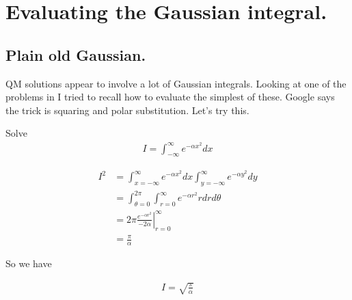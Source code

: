 
%
%



\chapter{Evaluating the Gaussian integral. }
\label{chap:gaussian}
\date{ Jan 05, 2009.  $RCSfile: gaussian.tex,v $ Last $Revision: 1.13 $ $Date: 2009/06/14 23:51:45 $ }

%

\section{Plain old Gaussian. }

QM solutions appear to involve a lot of Gaussian integrals.  Looking at one
of the problems in \cite{mcmahon2005qmd} I tried to recall how to evaluate
the simplest of these.  Google says the trick is squaring and polar 
substitution.  Let's try this.

Solve
\begin{align*}
I = \int_{-\infty}^\infty e^{-\alpha x^2} dx
\end{align*}

\begin{align*}
I^2 
&= \int_{x= -\infty}^\infty e^{-\alpha x^2} dx \int_{y = -\infty}^\infty e^{-\alpha y^2} dy \\
&= \int_{\theta=0}^{2\pi}\int_{r= 0}^\infty e^{-\alpha r^2} r dr d\theta \\
&= 2\pi 
{\left.
\frac{e^{-\alpha r^2}}{-2\alpha}
\right\vert}_{r= 0}^\infty  \\
&= \frac{\pi}{\alpha}
\end{align*}

So we have

\begin{align*}
I = \sqrt{\frac{\pi}{\alpha}}
\end{align*}

